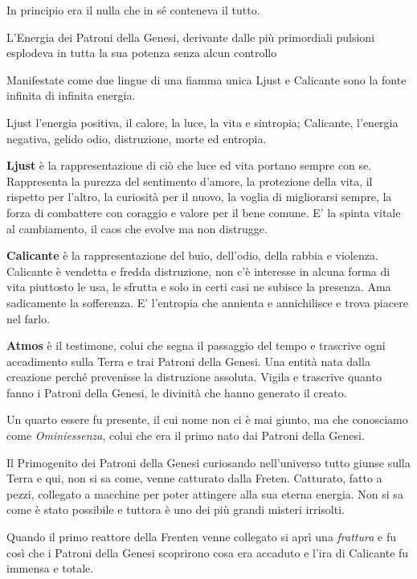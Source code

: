 \begin{multicols}{2}

In principio era il nulla che in sé conteneva il tutto.

L'Energia dei Patroni della Genesi, derivante dalle più primordiali pulsioni esplodeva in tutta la sua potenza senza alcun controllo 

Manifestate come due lingue di una fiamma unica Ljust e Calicante sono la fonte infinita di infinita energia.

Ljust l'energia positiva, il calore, la luce, la vita e sintropia; Calicante, l'energia negativa, gelido odio, distruzione, morte ed entropia.

\textbf{Ljust} è la rappresentazione di ciò che luce ed vita portano sempre con se. Rappresenta la purezza del sentimento d'amore, la protezione della vita, il rispetto per l'altro, la curiosità per il nuovo, la voglia di migliorarsi sempre, la forza di combattere con coraggio e valore per il bene comune. E' la spinta vitale al cambiamento, il caos che evolve ma non distrugge.

\textbf{Calicante} è la rappresentazione del buio, dell'odio, della rabbia e violenza. Calicante è vendetta e fredda distruzione, non c'è interesse in alcuna forma di vita piuttosto le usa, le sfrutta e solo in certi casi ne subisce la presenza. Ama sadicamente la sofferenza. E' l'entropia che annienta e annichilisce e trova piacere nel farlo.

\textbf{Atmos} è il testimone, colui che segna il passaggio del tempo e trascrive ogni accadimento sulla Terra e trai Patroni della Genesi. Una entità nata dalla creazione perché prevenisse la distruzione assoluta. Vigila e trascrive quanto fanno i Patroni della Genesi, le divinità che hanno generato il creato.

Un quarto essere fu presente, il cui nome non ci è mai giunto, ma che conosciamo come \emph{Ominiessenza}, colui che era il primo nato dai Patroni della Genesi.

Il Primogenito dei Patroni della Genesi curiosando nell'universo tutto giunse sulla Terra e qui, non si sa come, venne catturato dalla Freten.
Catturato, fatto a pezzi, collegato a macchine per poter attingere alla sua eterna energia. Non si sa come è stato possibile e tuttora è uno dei più grandi misteri irrisolti.

Quando il primo reattore della Frenten venne collegato si aprì una \emph{frattura} e fu così che i Patroni della Genesi scoprirono cosa era accaduto e l'ira di Calicante fu immensa e totale.


\end{multicols}
